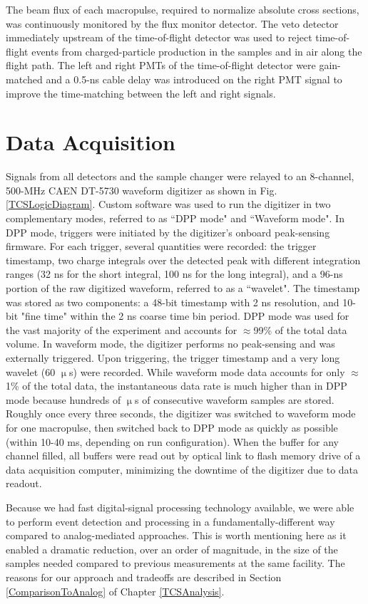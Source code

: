 The beam flux of each macropulse, required to normalize absolute cross sections, was continuously
monitored by the flux monitor detector. The veto detector immediately upstream
of the time-of-flight detector was used to reject time-of-flight events from
charged-particle production in the samples and in air along the flight path. The
left and right PMTs of the time-of-flight detector were gain-matched and a
0.5-ns cable delay was introduced on the right PMT signal to improve the
time-matching between the left and right signals.

\section{Data Acquisition}
Signals from all detectors and the sample changer were relayed to an 8-channel, 500-MHz CAEN 
DT-5730
waveform digitizer as shown in Fig. \ref{TCSLogicDiagram}. Custom software was used to run the 
digitizer in two complementary modes, referred to as ``DPP mode" and ``Waveform 
mode". In DPP mode, triggers were initiated by the digitizer's onboard
peak-sensing firmware. For each trigger, several quantities were recorded: the trigger 
timestamp, two charge integrals over the detected peak with different
integration ranges (32 ns for the short integral, 100 ns for the long integral),
and a 96-ns portion of the raw digitized waveform, referred to as a ``wavelet".
The timestamp was stored as two components: a 48-bit timestamp with 2 ns
resolution, and 10-bit "fine time" within the 2 ns coarse time bin period.
DPP mode was used for the vast majority of the 
experiment and accounts for $\approx$99\% of the total data volume. In waveform mode, 
the digitizer performs no peak-sensing and was externally triggered. Upon 
triggering, the trigger timestamp and a very long wavelet (60 $\upmu$s) 
were recorded. While waveform mode data accounts for only $\approx$1\% of the total data, 
the instantaneous data rate is much higher than in DPP 
mode because hundreds of $\upmu$s of consecutive waveform samples are 
stored. Roughly once every three seconds, the digitizer was switched to 
waveform mode for one macropulse, then switched back to DPP mode as quickly as
possible (within 10-40 ms, depending on run configuration). When the buffer for
any channel filled, all buffers were read out by optical link to flash memory
drive of a data acquisition computer, minimizing the downtime of the digitizer
due to data readout.

Because we had fast digital-signal processing technology available, we were able
to perform event detection and processing in a fundamentally-different way
compared to analog-mediated approaches. This is worth mentioning
here as it enabled a dramatic reduction, over an order of magnitude, in the size of the
samples needed compared to previous measurements at the same facility. The reasons
for our approach and tradeoffs are
described in Section \ref{ComparisonToAnalog} of Chapter \ref{TCSAnalysis}.

